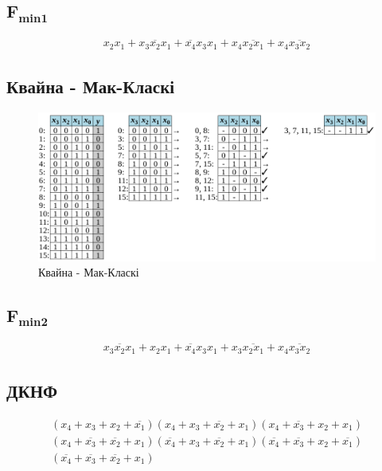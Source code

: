 \documentclass{article}
\begin{document}
\begin{normalsize}
	\subsection*{$\bm{F_{min1}}$}
	\begin{Large}
		\begin{gather}
			x_2x_1+\overline{x_3x_2x_1}+\overline{x_4}x_3x_1+x_4\overline{x_2x_1}+x_4\overline{x_3x_2}\nonumber
		\end{gather}
	\end{Large}

	\subsection*{Квайна - Мак-Класкі}
	\begin{figure}[H]
		\centering
		\includegraphics[scale=0.52]{r2}
		\caption{Квайна - Мак-Класкі}
	\end{figure}

	\subsection*{$\bm{F_{min2}}$}
	\begin{Large}
		\begin{gather}
			\overline{x_3x_2x_1}+x_2x_1+\overline{x_4}x_3x_1+x_3\overline{x_2x_1}+x_4\overline{x_3x_2}\nonumber		
		\end{gather}
	\end{Large}

	\subsection*{ДКНФ} 
	\begin{Large}
		\begin{gather}
			(x_4+x_3+x_2+\overline{x_1})
			(x_4+x_3+\overline{x_2}+x_1)
			(x_4+\overline{x_3}+x_2+x_1)\nonumber\\
			(x_4+\overline{x_3}+\overline{x_2}+x_1)
			(\overline{x_4}+x_3+\overline{x_2}+x_1)
			(\overline{x_4}+\overline{x_3}+x_2+\overline{x_1})\nonumber\\
			(\overline{x_4}+\overline{x_3}+\overline{x_2}+x_1)\nonumber
		\end{gather}
	\end{Large}
	

\end{normalsize}
\end{document}
